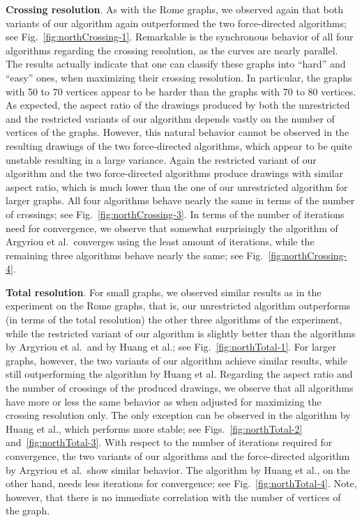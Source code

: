 \documentclass{comjnl}
\newcommand{\myparagraph}[1]{\medskip\noindent\textbf{#1}.}
\begin{document}
\myparagraph{Crossing resolution} As with the Rome graphs, we observed again that both variants of our algorithm again outperformed the two force-directed algorithms; see Fig.~\ref{fig:northCrossing-1}. Remarkable is the synchronous behavior of all four algorithms regarding the crossing resolution, as the curves are nearly parallel. The results actually indicate that one can classify these graphs into ``hard'' and ``easy'' ones, when maximizing their crossing resolution. In particular, the graphs with 50 to 70 vertices appear to be harder than the graphs with 70 to 80 vertices. As expected, the aspect ratio of the drawings produced by both the unrestricted and the restricted variants of our algorithm depends vastly on the number of vertices of the graphs. However, this natural behavior cannot be observed in the resulting drawings of the two force-directed algorithms, which appear to be quite unstable resulting in a large variance. Again the restricted variant of our algorithm and the two force-directed algorithms produce drawings with similar aspect ratio, which is much lower than the one of our unrestricted algorithm for larger graphs. All four algorithms behave nearly the same in terms of the number of crossings; see Fig.~\ref{fig:northCrossing-3}. In terms of the number of iterations need for convergence, we observe that somewhat surprisingly the algorithm of Argyriou et al.\ converges using the least amount of iterations, while the remaining three algorithms behave nearly the same; see Fig.~\ref{fig:northCrossing-4}.

\myparagraph{Total resolution} For small graphs, we observed similar results as in the experiment on the Rome graphs, that is, our unrestricted algorithm outperforms (in terms of the total resolution) the other three algorithms of the experiment, while the restricted variant of our algorithm is slightly better than the algorithms by Argyriou et al.\ and by Huang et al.; see Fig.~\ref{fig:northTotal-1}. For larger graphs, however, the two variants of our algorithm achieve similar results, while still outperforming the algorithm by Huang et al. Regarding the aspect ratio and the number of crossings of the produced drawings, we observe that all algorithms have more or less the same behavior as when adjusted for maximizing the crossing resolution only. The only exception can be observed in the algorithm by Huang et al., which performs more stable; see Figs.~\ref{fig:northTotal-2} and~\ref{fig:northTotal-3}. With respect to the number of iterations required for convergence, the two variants of our algorithms and the force-directed algorithm by Argyriou et al.\ show similar behavior. The algorithm by Huang et al., on the other hand, needs less iterations for convergence; see Fig.~\ref{fig:northTotal-4}. Note, however, that there is no immediate correlation with the number of vertices of the graph.
\end{document}
